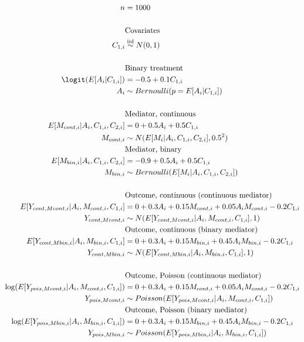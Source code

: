 \documentclass[10pt]{article}
\begin{document}
\begin{align*}
  n
  &= 1000\\
  \\
  &\text{Covariates}\\
  C_{1,i} &\overset{\text{iid}}{\sim} N(0,1)\\
  \\
  &\text{Binary treatment}\\
  \logit(E[A_{i} | C_{1,i}])
  &= -0.5 + 0.1 C_{1,i}\\
  A_{i} &\sim Bernoulli(p = E[A_{i} | C_{1,i}])\\
  \\
  &\text{Mediator, continuous}\\
  E[M_{cont,i} | A_{i}, C_{1,i}, C_{2,i}]
  &= 0 + 0.5 A_{i} + 0.5 C_{1,i}\\
  M_{cont,i} &\sim N(E[M_{i} | A_{i}, C_{1,i}, C_{2,i}], 0.5^{2})\\
  &\text{Mediator, binary}\\
  E[M_{bin,i} | A_{i}, C_{1,i}, C_{2,i}]
  &= -0.9 + 0.5 A_{i} + 0.5 C_{1,i}\\
  M_{bin,i} &\sim Bernoulli(E[M_{i} | A_{i}, C_{1,i}, C_{2,i}])\\
  \\
  &\text{Outcome, continuous (continuous mediator)}\\
  E[Y_{cont,Mcont,i} | A_{i}, M_{cont,i}, C_{1,i}]
  &= 0 + 0.3 A_{i} + 0.15 M_{cont,i} + 0.05 A_{i} M_{cont,i} -0.2 C_{1,i}\\
  Y_{cont,Mcont,i} &\sim N(E[Y_{cont,Mcont,i} | A_{i}, M_{cont,i}, C_{1,i}], 1)\\
  &\text{Outcome, continuous (binary mediator)}\\
  E[Y_{cont,Mbin,i} | A_{i}, M_{bin,i}, C_{1,i}]
  &= 0 + 0.3 A_{i} + 0.15 M_{bin,i} + 0.45 A_{i} M_{bin,i} -0.2 C_{1,i}\\
  Y_{cont,Mbin,i} &\sim N(E[Y_{cont,Mbin,i} | A_{i}, M_{bin,i}, C_{1,i}], 1)\\
  \\
  &\text{Outcome, Poisson (continuous mediator)}\\
  \log(E[Y_{pois,Mcont,i} | A_{i}, M_{cont,i}, C_{1,i}])
  &= 0 + 0.3 A_{i} + 0.15 M_{cont,i} + 0.05 A_{i} M_{cont,i} -0.2 C_{1,i}\\
  Y_{pois,Mcont,i} &\sim Poisson(E[Y_{pois,Mcont,i} | A_{i}, M_{cont,i}, C_{1,i}])\\
  &\text{Outcome, Poisson (binary mediator)}\\
  \log(E[Y_{pois,Mbin,i} | A_{i}, M_{bin,i}, C_{1,i}])
  &= 0 + 0.3 A_{i} + 0.15 M_{bin,i} + 0.45 A_{i} M_{bin,i} -0.2 C_{1,i}\\
  Y_{pois,Mbin,i} &\sim Poisson(E[Y_{pois,Mbin,i} | A_{i}, M_{bin,i}, C_{1,i}])\\
\end{align*}
\end{document}
